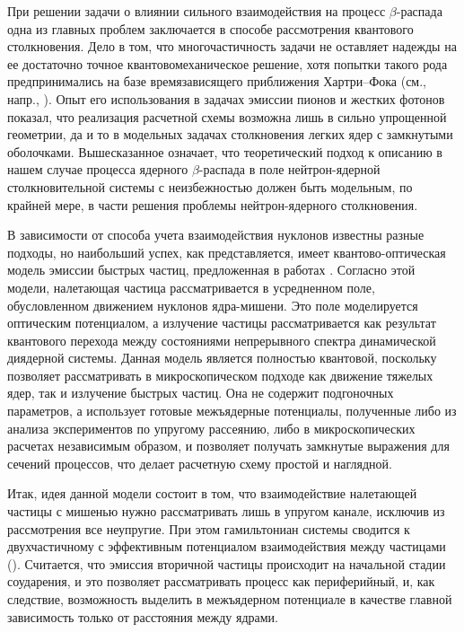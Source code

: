 При решении
задачи о влиянии сильного взаимодействия на процесс $\beta$-распада одна из
главных проблем заключается в способе рассмотрения квантового столкновения.
Дело  в  том,  что многочастичность задачи не оставляет
надежды  на  ее достаточно точное квантовомеханическое решение,
хотя
попытки   такого   рода   предпринимались  на  базе  времязависящего
приближения   Хартри--Фока   (см.,  напр., \cite{NPh1986,NPh1987}).
Опыт  его
использования  в  задачах  эмиссии пионов и жестких фотонов показал,
что  реализация  расчетной  схемы  возможна лишь в сильно упрощенной
геометрии,  да  и  то  в  модельных задачах столкновения легких ядер
с  замкнутыми  оболочками.  Вышесказанное означает, что
теоретический   подход   к   описанию   в нашем случае
процесса ядерного $\beta$-распада  в  поле нейтрон-ядерной
столкновительной  системы  с неизбежностью должен быть модельным, по
крайней мере, в части решения проблемы нейтрон-ядерного столкновения.


В зависимости от способа учета взаимодействия нуклонов известны разные
подходы, но наибольший успех, как представляется, имеет квантово-оптическая
модель эмиссии быстрых частиц, предложенная в работах
\cite{IAF1988,kamanin,IAF1990,ECHA1991}.
Согласно этой модели, налетающая частица рассматривается в усредненном поле,
обусловленном движением нуклонов ядра-мишени. Это поле моделируется оптическим
потенциалом, а излучение частицы рассматривается как результат квантового
перехода между состояниями непрерывного спектра динамической диядерной системы.
Данная модель является полностью квантовой, поскольку
позволяет рассматривать в микроскопическом подходе как движение тяжелых ядер,
так и излучение быстрых частиц. Она  не содержит подгоночных
параметров, а использует готовые межъядерные потенциалы, полученные либо из
анализа экспериментов по упругому рассеянию, либо в микроскопических
расчетах независимым образом, и
позволяет получать замкнутые выражения для
сечений процессов, что делает расчетную схему простой и наглядной.

Итак, идея данной модели состоит в том, что взаимодействие налетающей частицы с мишенью нужно рассматривать лишь в
упругом канале, исключив из рассмотрения все неупругие. При этом гамильтониан системы сводится к двухчастичному с
эффективным потенциалом взаимодействия между частицами (\cite{Hot, Bal}). Считается, что  эмиссия   вторичной частицы
происходит  на  начальной стадии соударения, и это позволяет рассматривать процесс как периферийный, и, как следствие,
возможность выделить в межъядерном потенциале в качестве главной зависимость только от расстояния между ядрами.



